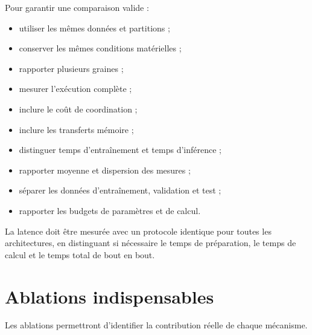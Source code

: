 \documentclass[11pt,a4paper]{article}
\begin{document}
Pour garantir une comparaison valide :
\begin{itemize}
  \item utiliser les mêmes données et partitions ;
  \item conserver les mêmes conditions matérielles ;
  \item rapporter plusieurs graines ;
  \item mesurer l'exécution complète ;
  \item inclure le coût de coordination ;
  \item inclure les transferts mémoire ;
  \item distinguer temps d'entraînement et temps d'inférence ;
  \item rapporter moyenne et dispersion des mesures ;
  \item séparer les données d'entraînement, validation et test ;
  \item rapporter les budgets de paramètres et de calcul.
\end{itemize}

La latence doit être mesurée avec un protocole identique pour
toutes les architectures, en distinguant si nécessaire le temps
de préparation, le temps de calcul et le temps total de bout en bout.

\section{Ablations indispensables}

Les ablations permettront d'identifier la contribution réelle
de chaque mécanisme.
\end{document}
